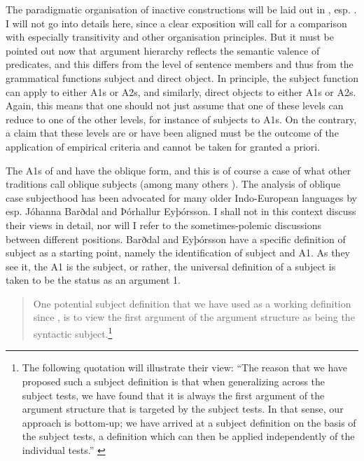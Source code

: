 \documentclass[output=paper]{langscibook}
\begin{document}
The paradigmatic organisation of inactive constructions will be laid out in , esp. . I will not go into details here, since a clear exposition will call for a comparison with especially transitivity and other organisation principles. But it must be pointed out now that  argument hierarchy reflects the semantic valence of predicates, and this differs from the level of sentence members and thus from the grammatical functions subject and direct object. In principle, the subject function can apply to either A1s or A2s, and similarly, direct objects to either A1s or A2s. Again, this means that one should not just assume that one of these levels can reduce to one of the other levels, for instance of subjects to A1s. On the contrary, a claim that these levels are or have been aligned must be the outcome of the application of empirical criteria and cannot be taken for granted a priori.\largerpage

The A1s of  and  have the oblique form, and this is of course a case of what other traditions call oblique subjects (among many others \citealt{Allen1995, BarðdalEyþórssson2003, BarðdalEyþórsson2018, EyþórssonBarðdal2005, Kiparsky1997}). The analysis of oblique case subjecthood has been advocated for many older Indo-European languages by esp. Jóhanna Barðdal and Þórhallur Eyþórsson. I shall not in this context discuss their views in detail, nor will I refer to the sometimes-polemic discussions between different positions. Barðdal and Eyþórsson have a specific definition of subject as a starting point, namely the identification of subject and A1. As they see  it, the A1 is the subject, or rather, the universal definition of a subject is taken to be the status as an argument 1.

\begin{quote}
    One potential subject definition that we have used as a working definition since \citet{EyþórssonBarðdal2005}, is to view the first argument of the argument structure as being the syntactic subject.\footnote{The following quotation will illustrate their view: ``The reason that we have proposed such a subject definition is that when generalizing across the subject tests, we have found that it is always the first argument of the argument structure that is targeted by the subject tests. In that sense, our approach is bottom-up; we have arrived at a subject definition on the basis of the subject tests, a definition which can then be applied independently of the individual tests.” \citep[263--264]{BarðdalEyþórsson2018}}  \citep[263]{BarðdalEyþórsson2018}
\end{quote}
\end{document}
